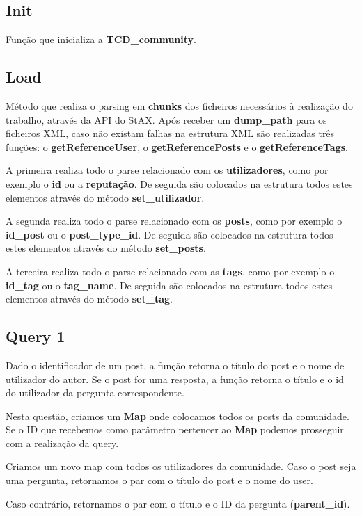 \documentclass[a4paper]{article}
\begin{document}
\subsection{Init}

Função que inicializa a \textbf{TCD\_community}. 

\subsection{Load}
Método que realiza o parsing em \textbf{chunks} dos ficheiros necessários à 
realização do trabalho, através da API do StAX. Após receber um 
\textbf{dump\_path} para os ficheiros  XML, caso não existam falhas na 
estrutura XML são realizadas três funções: o \textbf{getReferenceUser}, 
o \textbf{getReferencePosts} e o \textbf{getReferenceTags}.

A primeira realiza todo o parse relacionado com os \textbf{utilizadores}, 
como por exemplo o \textbf{id} ou a \textbf{reputação}. De seguida são 
colocados na estrutura todos estes elementos através do método
\textbf{set\_utilizador}.

A segunda realiza todo o parse relacionado com os \textbf{posts}, 
como por exemplo o \textbf{id\_post} ou o \textbf{post\_type\_id}. 
De seguida são colocados na estrutura todos estes elementos através do 
método \textbf{set\_posts}.

A terceira realiza todo o parse relacionado com as \textbf{tags}, 
como por exemplo o \textbf{id\_tag} ou o \textbf{tag\_name}. 
De seguida são colocados na estrutura todos estes elementos através do 
método \textbf{set\_tag}.

\subsection{Query 1}

Dado o identificador de um post, a função retorna o título do post 
e o nome de utilizador do autor. Se o post for uma resposta, a função
retorna o título e o id do utilizador da pergunta correspondente.

Nesta questão, criamos um  \textbf{Map} onde colocamos todos os posts da comunidade.
Se o ID que recebemos como parâmetro pertencer ao  \textbf{Map} podemos prosseguir
com a realização da query.

Criamos um novo map com todos os utilizadores da comunidade. Caso o post seja 
uma pergunta, retornamos o par com o título do post e o nome do user.

Caso contrário, retornamos o par com o título e o ID da pergunta 
(\textbf{parent\_id}).
\end{document}
